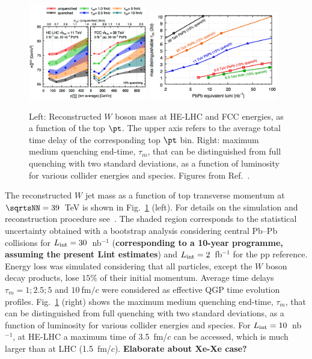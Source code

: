 \documentclass[../report.tex]{subfiles}
\begin{document}
\begin{figure}[!t]
\begin{center}
\includegraphics[width=0.46\textwidth]{helhc/figs/WMass_tops.pdf}
\hfill
\includegraphics[width=0.5\textwidth]{helhc/figs/Taum_tops.pdf}
\caption{Left: Reconstructed $W$ boson mass at HE-LHC and FCC
  energies, as a function of the top $\pt$. The upper axis refers to
  the average total time delay of the corresponding top $\pt$
  bin. Right: maximum medium quenching
end-time, $\tau_m$, that can be distinguished from full quenching with
two standard deviations, as a function of luminosity for various
collider energies and species. Figures from Ref.~\cite{Apolinario:2017sob}.}
\label{fig:tops}
\end{center}
\end{figure}


The reconstructed $W$ jet mass as a function of top transverse
momentum at $\sqrtsNN = 39$~TeV is shown in Fig.~\ref{fig:tops}
(left). For details on the simulation and reconstruction procedure
see~\cite{Apolinario:2017sob}. 
The shaded region corresponds to the statistical uncertainty obtained
with a bootstrap analysis considering central Pb--Pb collisions for
$L_{\rm int} = 30$~nb$^{-1}$ ({\bf corresponding to a 10-year
  programme, assuming the present Lint estimates})
and $L_{\rm int} = 2$~fb$^{-1}$ for the pp reference.
Energy loss was simulated considering that all particles, except the $W$ boson decay products, lose $15\%$ of their initial momentum. 
Average time delays $\tau_m = 1; 2.5; 5$ and $10~$fm$/c$ were considered as effective QGP time evolution profiles. 
Fig.~\ref{fig:tops} (right) shows the maximum medium quenching
end-time, $\tau_m$, that can be distinguished from full quenching with
two standard deviations, as a function of luminosity for various
collider energies and species. For $L_{\rm int}=10$~nb$^{-1}$, at
HE-LHC a maximum time of 3.5~fm/$c$ can be accessed, which is much
larger than at LHC (1.5~fm/$c$). {\bf Elaborate about Xe-Xe case?}
\end{document}
